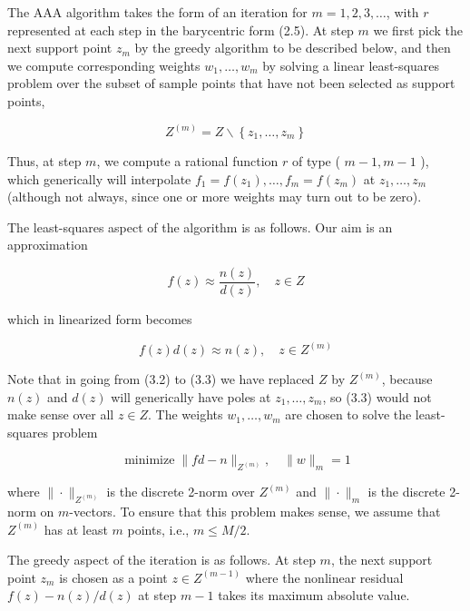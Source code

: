 \documentclass[11pt]{article}
\theoremstyle{definition}
\begin{document}
The AAA algorithm takes the form of an iteration for $m=1,2,3, \ldots$, with $r$ represented at each step in the barycentric form (2.5). At step $m$ we first pick the next support point $z_{m}$ by the greedy algorithm to be described below, and then we compute corresponding weights $w_{1}, \ldots, w_{m}$ by solving a linear least-squares problem over the subset of sample points that have not been selected as support points,


\begin{equation*}
Z^{(m)}=Z \backslash\left\{z_{1}, \ldots, z_{m}\right\} \tag{3.1}
\end{equation*}


Thus, at step $m$, we compute a rational function $r$ of type ( $m-1, m-1$ ), which generically will interpolate $f_{1}=f\left(z_{1}\right), \ldots, f_{m}=f\left(z_{m}\right)$ at $z_{1}, \ldots, z_{m}$ (although not always, since one or more weights may turn out to be zero).

The least-squares aspect of the algorithm is as follows. Our aim is an approximation


\begin{equation*}
f(z) \approx \frac{n(z)}{d(z)}, \quad z \in Z \tag{3.2}
\end{equation*}


which in linearized form becomes


\begin{equation*}
f(z) d(z) \approx n(z), \quad z \in Z^{(m)} \tag{3.3}
\end{equation*}


Note that in going from (3.2) to (3.3) we have replaced $Z$ by $Z^{(m)}$, because $n(z)$ and $d(z)$ will generically have poles at $z_{1}, \ldots, z_{m}$, so (3.3) would not make sense over all $z \in Z$. The weights $w_{1}, \ldots, w_{m}$ are chosen to solve the least-squares problem


\begin{equation*}
\operatorname{minimize}\|f d-n\|_{Z^{(m)}}, \quad\|w\|_{m}=1 \tag{3.4}
\end{equation*}


where $\|\cdot\|_{Z^{(m)}}$ is the discrete 2-norm over $Z^{(m)}$ and $\|\cdot\|_{m}$ is the discrete 2-norm on $m$-vectors. To ensure that this problem makes sense, we assume that $Z^{(m)}$ has at least $m$ points, i.e., $m \leq M / 2$.

The greedy aspect of the iteration is as follows. At step $m$, the next support point $z_{m}$ is chosen as a point $z \in Z^{(m-1)}$ where the nonlinear residual $f(z)-n(z) / d(z)$ at step $m-1$ takes its maximum absolute value.
\end{document}
